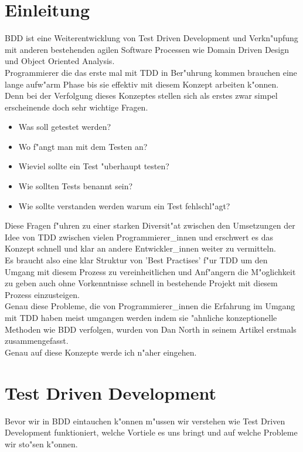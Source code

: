 \documentclass[runningheads,a4paper]{llncs}
\begin{document}
\section{Einleitung}
  BDD ist eine Weiterentwicklung von Test Driven Development und Verkn"upfung 
  mit anderen bestehenden agilen Software Processen wie Domain Driven Design 
  und Object Oriented Analysis.\\
  Programmierer die das erste mal mit TDD in Ber"uhrung kommen brauchen eine 
  lange aufw"arm Phase bis sie effektiv mit diesem Konzept arbeiten k"onnen. 
  Denn bei der Verfolgung dieses Konzeptes stellen sich als erstes zwar simpel 
  erscheinende doch sehr wichtige Fragen.\\
  \begin{itemize}
    \item Was soll getestet werden?
    \item Wo f"angt man mit dem Testen an?
    \item Wieviel sollte ein Test "uberhaupt testen?
    \item Wie sollten Tests benannt sein?
    \item Wie sollte verstanden werden warum ein Test fehlschl"agt?
  \end{itemize}
  Diese Fragen f"uhren zu einer starken Diversit"at zwischen den Umsetzungen
  der Idee von TDD zwischen vielen Programmierer\_innen und erschwert es das Konzept
  schnell und klar an andere Entwickler\_innen weiter zu vermitteln.\\
  Es braucht also eine klar Struktur von 'Best Practises' f"ur TDD um den 
  Umgang mit diesem Prozess zu vereinheitlichen und Anf"angern die M"oglichkeit
  zu geben auch ohne Vorkenntnisse schnell in bestehende Projekt mit diesem 
  Prozess einzusteigen.\\
  Genau diese Probleme, die von Programmierer\_innen die Erfahrung im Umgang mit TDD 
  haben meist umgangen werden indem sie "ahnliche konzeptionelle Methoden wie 
  BDD verfolgen, wurden von Dan North\cite{North:2006} in seinem 
  Artikel erstmals zusammengefasst.\\
  Genau auf diese Konzepte werde ich n"aher eingehen.

\section{Test Driven Development}
  Bevor wir in BDD eintauchen k"onnen m"ussen wir verstehen wie Test Driven 
  Development funktioniert, welche Vortiele es uns bringt und auf welche 
  Probleme wir sto"sen k"onnen.
\end{document}
